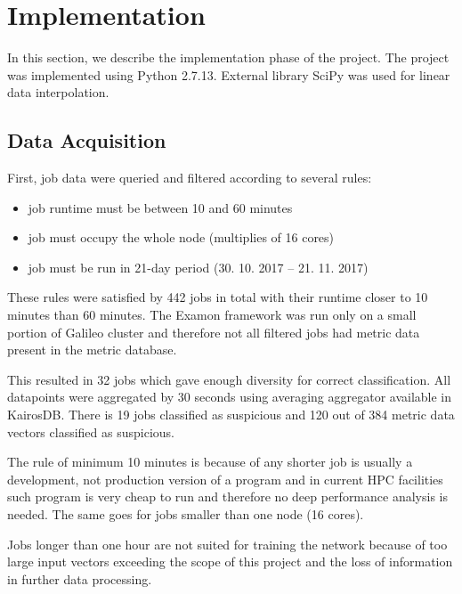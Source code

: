 \section{Implementation}
In this section, we describe the implementation phase of the project. The project was implemented using Python 2.7.13. External library SciPy\cite{scipy} was used for linear data interpolation.

\label{sec:implementation}

\subsection{Data Acquisition}
\label{sec:data-filter}
First, job data were queried and filtered according to several rules:
\begin{itemize}
    \item job runtime must be between 10 and 60 minutes
    \item job must occupy the whole node (multiplies of 16 cores)
    \item job must be run in 21-day period (30. 10. 2017 -- 21. 11. 2017)
\end{itemize}

These rules were satisfied by 442 jobs in total with their runtime closer to 10 minutes than 60 minutes. The Examon framework was run only on a small portion of Galileo cluster and therefore not all filtered jobs had metric data present in the metric database.


This resulted in 32 jobs which gave enough diversity for correct classification. All datapoints were aggregated by 30 seconds using averaging aggregator available in KairosDB. There is 19 jobs classified as suspicious and 120 out of 384 metric data vectors classified as suspicious.

The rule of minimum 10 minutes is because of any shorter job is usually a development, not production version of a program and in current HPC facilities such program is very cheap to run and therefore no deep performance analysis is needed. The same goes for jobs smaller than one node (16 cores).

Jobs longer than one hour are not suited for training the network because of too large input vectors exceeding the scope of this project and the loss of information in further data processing.

